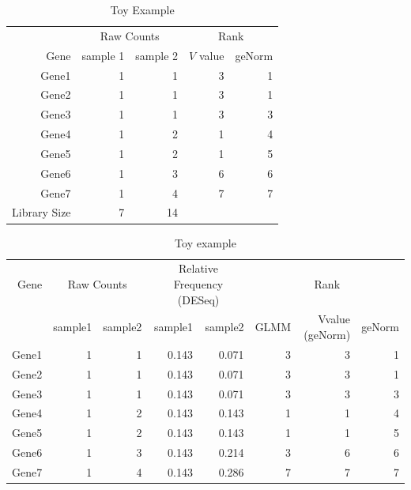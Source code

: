 \documentclass[11pt, a4paper]{article}
\begin{document}
\begin{table}[ht]
	\centering
	\begin{tabular}{rrrrr}
		\hline
		 & \multicolumn{2}{c}{Raw Counts} & \multicolumn{2}{c}{Rank}\\
	Gene	& sample 1 & sample 2 & $V$ value & geNorm \\ 
		\hline
		Gene1 & 1 & 1 & 3 & 1 \\ 
		Gene2 & 1 & 1 & 3 & 1 \\ 
		Gene3 & 1 & 1 & 3 & 3 \\ 
		Gene4 & 1 & 2 & 1 & 4 \\ 
		Gene5 & 1 & 2 & 1 & 5 \\ 
		Gene6 & 1 & 3 & 6 & 6 \\ 
		Gene7 & 1 & 4 & 7 & 7 \\ \hline 
	Library Size & 7 & 14 & & 	\\
		\hline
		\end{tabular}
		\caption{Toy Example} 
		\label{table:toyexample}
		\end{table}


\begin{table}[ht]
	\centering
	\caption{Toy example}
	\label{table:toyexample2}
	\begin{tabular}{rrrrrrrr}
		\hline
	Gene & \multicolumn{2}{c}{Raw Counts} & \multicolumn{2}{c}{Relative Frequency (DESeq)} & \multicolumn{3}{c}{Rank} \\
		& sample1 & sample2 & sample1 &sample2 & GLMM & Vvalue (geNorm) & geNorm \\ 
		\hline
		Gene1 & 1 & 1 & 0.143 & 0.071 & 3 & 3 & 1 \\ 
		Gene2 & 1 & 1 & 0.143 & 0.071 & 3 & 3 & 1 \\ 
		Gene3 & 1 & 1 & 0.143 & 0.071 & 3 & 3 & 3 \\ 
		Gene4 & 1 & 2 & 0.143 & 0.143 & 1 & 1 & 4 \\ 
		Gene5 & 1 & 2 & 0.143 & 0.143 & 1 & 1 & 5 \\ 
		Gene6 & 1 & 3 & 0.143 & 0.214 & 3 & 6 & 6 \\ 
		Gene7 & 1 & 4 & 0.143 & 0.286 & 7 & 7 & 7 \\ 
		\hline
	\end{tabular}
\end{table}




\end{document}
